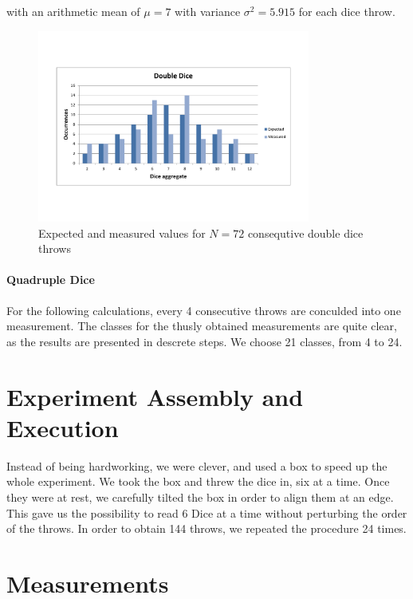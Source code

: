 \documentclass{scrreprt}
\begin{document}
with an arithmetic mean of $\mu = 7$ with variance $\sigma^2 = 5.915$ for each dice throw.

\begin{figure}[H]
    \center   
        \includegraphics[width=0.8\textwidth]{img/double_dice_combo.pdf}
        \caption{Expected and measured values for $N=72$ consequtive double dice throws}
\end{figure}

\paragraph{Quadruple Dice}
For the following calculations, every 4 consecutive throws are conculded into one measurement. The classes for the thusly obtained measurements are quite clear, as the results are presented in descrete steps. We choose 21 classes, from 4 to 24.

\section[The Experiment]{Experiment Assembly and Execution}
Instead of being hardworking, we were clever, and used a box to speed up the whole experiment. We took the box and threw the dice in, six at a time. Once they were at rest, we carefully tilted the box in order to align them at an edge. This gave us the possibility to read 6 Dice at a time without perturbing the order of the throws. In order to obtain 144 throws, we repeated the procedure 24 times.
\section{Measurements}
\end{document}
